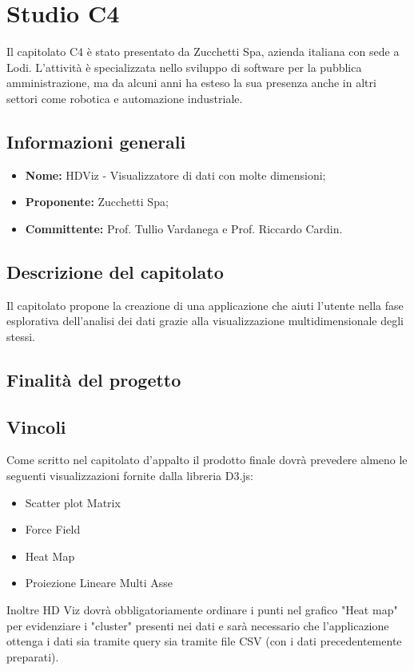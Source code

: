 \section{Studio C4}
Il capitolato C4 è stato presentato da Zucchetti Spa, azienda italiana con sede a Lodi. L'attività è specializzata nello sviluppo di software per la pubblica amministrazione, ma da alcuni anni ha esteso la sua presenza anche in altri settori come robotica e automazione industriale.

\subsection{Informazioni generali}
\begin{itemize}
    \item \textbf{Nome:} HDViz - Visualizzatore di dati con molte dimensioni;
    \item \textbf{Proponente:} Zucchetti Spa;
    \item \textbf{Committente:} Prof. Tullio Vardanega e Prof. Riccardo Cardin.
\end{itemize}

\subsection{Descrizione del capitolato}
Il capitolato propone la creazione di una applicazione che aiuti l'utente nella fase esplorativa dell'analisi dei dati grazie alla visualizzazione multidimensionale degli stessi.

\subsection{Finalità del progetto}


\subsection{Vincoli}
Come scritto nel capitolato d'appalto il prodotto finale dovrà prevedere almeno le seguenti visualizzazioni fornite dalla libreria D3.js:
\begin{itemize}
    \item Scatter plot Matrix
    \item Force Field
    \item Heat Map
    \item Proiezione Lineare Multi Asse
\end{itemize}

Inoltre HD Viz dovrà obbligatoriamente ordinare i punti nel grafico "Heat map" per evidenziare i "cluster" presenti nei dati e sarà necessario che l'applicazione ottenga i dati sia tramite query sia tramite file CSV (con i dati precedentemente preparati).


